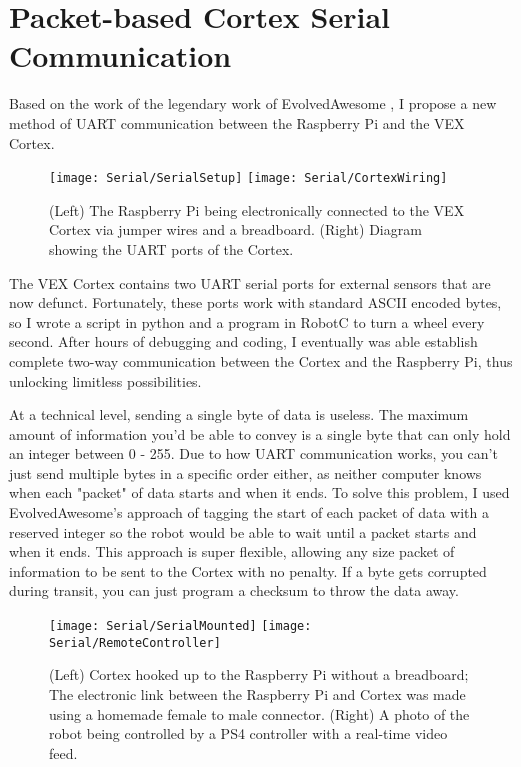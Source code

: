﻿\section{Packet-based Cortex Serial Communication}

Based on the work of the legendary work of EvolvedAwesome \cite{VEXSerial}, I propose a new method of UART communication \cite{UARTBasic} between the Raspberry Pi and the VEX Cortex.

\begin{figure}[h]
    \centering
    \texttt{[image: Serial/SerialSetup]}
    \texttt{[image: Serial/CortexWiring]}
    \caption{
        (Left) The Raspberry Pi being electronically connected to the VEX Cortex via jumper wires and a breadboard. (Right) Diagram showing the UART ports of the Cortex. \cite{CortexWiringCite}
    }
\end{figure}

The VEX Cortex contains two UART serial ports for external sensors that are now defunct. Fortunately, these ports work with standard ASCII encoded bytes, so I wrote a script in python and a program in RobotC to turn a wheel every second. After hours of debugging and coding, I eventually was able establish complete two-way communication between the Cortex and the Raspberry Pi, thus unlocking limitless possibilities.

At a technical level, sending a single byte of data is useless. The maximum amount of information you'd be able to convey is a single byte that can only hold an integer between 0 - 255. Due to how UART communication works, you can't just send multiple bytes in a specific order either, as neither computer knows when each "packet" of data starts and when it ends. To solve this problem, I used EvolvedAwesome's approach of tagging the start of each packet of data with a reserved integer so the robot would be able to wait until a packet starts and when it ends. This approach is super flexible, allowing any size packet of information to be sent to the Cortex with no penalty. If a byte gets corrupted during transit, you can just program a checksum to throw the data away.

\begin{figure}[h]
    \centering

    \texttt{[image: Serial/SerialMounted]}
    \texttt{[image: Serial/RemoteController]}
    \caption {
        (Left) Cortex hooked up to the Raspberry Pi without a breadboard; The electronic link between the Raspberry Pi and Cortex was made using a homemade female to male connector. (Right) A photo of the robot being controlled by a PS4 controller with a real-time video feed.
    }
\end{figure}

